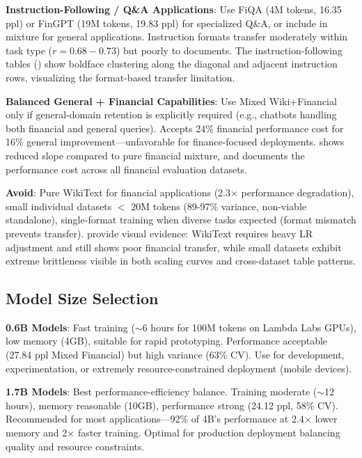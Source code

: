 \textbf{Instruction-Following / Q\&A Applications}: Use FiQA (4M tokens, 16.35 ppl) or FinGPT (19M tokens, 19.83 ppl) for specialized Q\&A, or include in mixture for general applications. Instruction formats transfer moderately within task type ($r = 0.68-0.73$) but poorly to documents. The instruction-following tables () show boldface clustering along the diagonal and adjacent instruction rows, visualizing the format-based transfer limitation.

\textbf{Balanced General + Financial Capabilities}: Use Mixed Wiki+Financial only if general-domain retention is explicitly required (e.g., chatbots handling both financial and general queries). Accepts 24\% financial performance cost for 16\% general improvement—unfavorable for finance-focused deployments.  shows reduced slope compared to pure financial mixture, and  documents the performance cost across all financial evaluation datasets.

\textbf{Avoid}: Pure WikiText for financial applications (2.3$\times$ performance degradation), small individual datasets $<$ 20M tokens (89-97\% variance, non-viable standalone), single-format training when diverse tasks expected (format mismatch prevents transfer).  provide visual evidence: WikiText requires heavy LR adjustment and still shows poor financial transfer, while small datasets exhibit extreme brittleness visible in both scaling curves and cross-dataset table patterns.

\subsection{Model Size Selection}

\textbf{0.6B Models}: Fast training ($\sim$6 hours for 100M tokens on Lambda Labs GPUs), low memory (4GB), suitable for rapid prototyping. Performance acceptable (27.84 ppl Mixed Financial) but high variance (63\% CV). Use for development, experimentation, or extremely resource-constrained deployment (mobile devices).

\textbf{1.7B Models}: Best performance-efficiency balance. Training moderate ($\sim$12 hours), memory reasonable (10GB), performance strong (24.12 ppl, 58\% CV). Recommended for most applications—92\% of 4B's performance at 2.4$\times$ lower memory and 2$\times$ faster training. Optimal for production deployment balancing quality and resource constraints.

